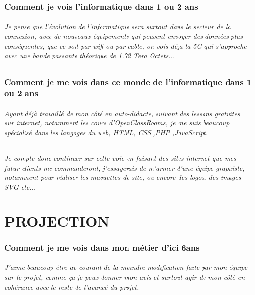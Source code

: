 \documentclass{article}
\begin{document}
\section{Comment je vois l'informatique dans 1 ou 2 ans}

\paragraph{Je pense que l'évolution de l'informatique sera surtout dans le secteur de la connexion, avec de nouveaux équipements qui peuvent envoyer des données plus conséquentes, que ce soit par wifi ou par cable, on vois déja la 5G qui s'approche avec une bande passante théorique de 1.72 Tera Octets...}

\section{Comment je me vois dans ce monde de l'informatique dans 1 ou 2 ans}

\paragraph{Ayant déjà travaillé de mon côté en auto-didacte, suivant des lessons gratuites sur internet, notamment les cours d'OpenClassRooms, je me suis beaucoup spécialisé dans les langages du web, HTML, CSS ,PHP ,JavaScript.}

\paragraph{Je compte donc continuer sur cette voie en faisant des sites internet que mes futur clients me commanderont, j'essayerais de m'armer d'une équipe graphiste, notamment pour réaliser les maquettes de site, ou encore des logos, des images SVG etc...}


\clearpage
\part{PROJECTION}
\setcounter{section}{0}

\section{Comment je me vois dans mon métier d'ici 6ans}

\paragraph{J'aime beaucoup être au courant de la moindre modification faite par mon équipe sur le projet, comme ça je peux donner mon avis et surtout agir de mon côté en cohérance avec le reste de l'avancé du projet.}
\end{document}
